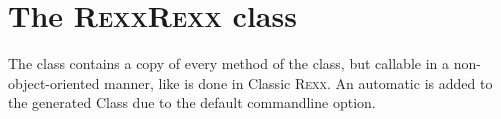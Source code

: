 \section{The R\textsc{exx}R\textsc{exx} class}\label{refrexxrexx}

The  class contains a copy of every method of the  class, but callable in a non-object-oriented manner, like is done in Classic R\textsc{exx}. An automatic  is added to the generated Class due to the default  commandline option.

